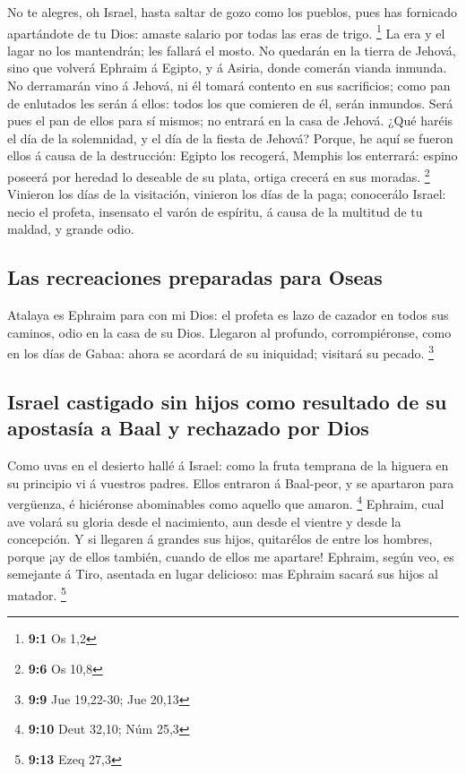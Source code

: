  No te alegres, oh Israel, hasta saltar de gozo como los
pueblos, pues has fornicado apartándote de tu Dios: amaste salario por
todas las eras de trigo. \footnote{\textbf{9:1} Os 1,2}  La
era y el lagar no los mantendrán; les fallará el mosto.  No
quedarán en la tierra de Jehová, sino que volverá Ephraim á Egipto, y á
Asiria, donde comerán vianda inmunda.  No derramarán vino á
Jehová, ni él tomará contento en sus sacrificios; como pan de enlutados
les serán á ellos: todos los que comieren de él, serán inmundos. Será
pues el pan de ellos para sí mismos; no entrará en la casa de Jehová.
 ¿Qué haréis el día de la solemnidad, y el día de la fiesta
de Jehová?  Porque, he aquí se fueron ellos á causa de la
destrucción: Egipto los recogerá, Memphis los enterrará: espino poseerá
por heredad lo deseable de su plata, ortiga crecerá en sus moradas.
\footnote{\textbf{9:6} Os 10,8}  Vinieron los días de la
visitación, vinieron los días de la paga; conocerálo Israel: necio el
profeta, insensato el varón de espíritu, á causa de la multitud de tu
maldad, y grande odio.

\hypertarget{las-recreaciones-preparadas-para-oseas}{%
\subsection{Las recreaciones preparadas para
Oseas}\label{las-recreaciones-preparadas-para-oseas}}

 Atalaya es Ephraim para con mi Dios: el profeta es lazo de
cazador en todos sus caminos, odio en la casa de su Dios. 
Llegaron al profundo, corrompiéronse, como en los días de Gabaa: ahora
se acordará de su iniquidad; visitará su pecado. \footnote{\textbf{9:9}
  Jue 19,22-30; Jue 20,13}

\hypertarget{israel-castigado-sin-hijos-como-resultado-de-su-apostasuxeda-a-baal-y-rechazado-por-dios}{%
\subsection{Israel castigado sin hijos como resultado de su apostasía a
Baal y rechazado por
Dios}\label{israel-castigado-sin-hijos-como-resultado-de-su-apostasuxeda-a-baal-y-rechazado-por-dios}}

 Como uvas en el desierto hallé á Israel: como la fruta
temprana de la higuera en su principio vi á vuestros padres. Ellos
entraron á Baal-peor, y se apartaron para vergüenza, é hiciéronse
abominables como aquello que amaron. \footnote{\textbf{9:10} Deut 32,10;
  Núm 25,3}  Ephraim, cual ave volará su gloria desde el
nacimiento, aun desde el vientre y desde la concepción.  Y
si llegaren á grandes sus hijos, quitarélos de entre los hombres, porque
¡ay de ellos también, cuando de ellos me apartare! 
Ephraim, según veo, es semejante á Tiro, asentada en lugar delicioso:
mas Ephraim sacará sus hijos al matador. \footnote{\textbf{9:13} Ezeq
  27,3}

